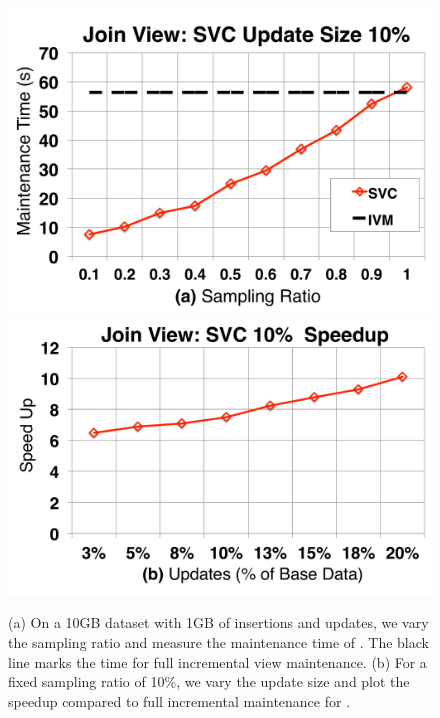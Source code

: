 \begin{figure}[t]\vspace{-2em}
\centering
\includegraphics[scale=0.13]{exp/msj_1.pdf}
\includegraphics[scale=0.13]{exp/msj_2.pdf}\vspace{-1em}
 \caption{(a) On a 10GB dataset with 1GB of insertions and updates, we vary the sampling ratio and measure the maintenance time of \svc. The black line marks the time for full incremental view maintenance. (b) For a fixed sampling ratio of 10\%, we vary the update size and plot the speedup compared to full incremental maintenance for \svc. \vspace{-1em}\label{exp-1-samplesize}}
\end{figure}

